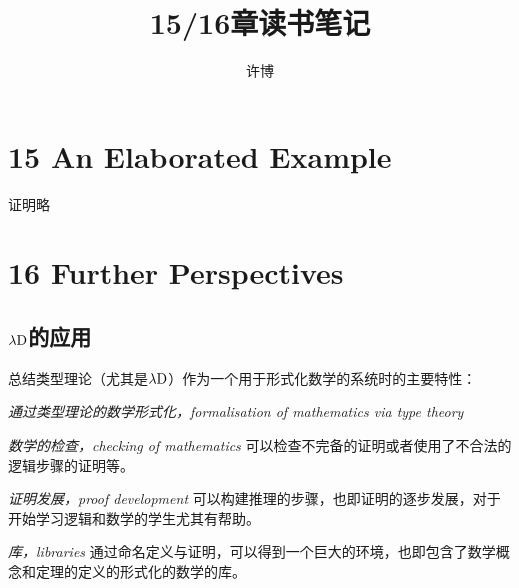 \documentclass[UTF8]{article}
\title{15/16章读书笔记}
\author{许博}
\date{}
\begin{document}
\maketitle

\newpage
\section{15 An Elaborated Example}
	证明略
	
\newpage
\section{16 Further Perspectives}
	\subsection{$\lambda{\rm D}$的应用}
	\noindent
	总结类型理论（尤其是$\lambda{\rm D}$）作为一个用于形式化数学的系统时的主要特性：
	
		\textit{通过类型理论的数学形式化，formalisation of mathematics via type theory}
		
		\textit{数学的检查，checking of mathematics} 可以检查不完备的证明或者使用了不合法的逻辑步骤的证明等。
		
		\textit{证明发展，proof development} 可以构建推理的步骤，也即证明的逐步发展，对于开始学习逻辑和数学的学生尤其有帮助。
		
		\textit{库，libraries} 通过命名定义与证明，可以得到一个巨大的环境，也即包含了数学概念和定理的定义的形式化的数学的库。
\end{document}
